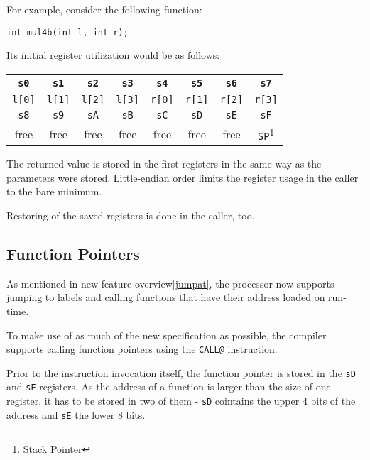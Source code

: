         For example, consider the following function:

        \begin{center}
            \texttt{int mul4b(int l, int r);}
        \end{center}

        Its initial register utilization would be as follows:

        \begin{center}\begin{tabular}{ | c | c | c | c | c | c | c | c | }
            \hline
            \texttt{s0} & \texttt{s1} & \texttt{s2} & \texttt{s3} & \texttt{s4} & \texttt{s5} & \texttt{s6} & \texttt{s7} \\
            \hline
            \texttt{l[0]} & \texttt{l[1]} & \texttt{l[2]} & \texttt{l[3]} & \texttt{r[0]} & \texttt{r[1]} & \texttt{r[2]} & \texttt{r[3]} \\
            \hline
            \hline
            \texttt{s8} & \texttt{s9} & \texttt{sA} & \texttt{sB} & \texttt{sC} & \texttt{sD} & \texttt{sE} & \texttt{sF} \\
            \hline
            free & free & free & free & free & free & free & \texttt{SP}\footnote{Stack Pointer} \\
            \hline
        \end{tabular}\end{center}

        The returned value is stored in the first registers in the same way as the parameters were stored. Little-endian order limits the register usage in the caller to the bare minimum.

        Restoring of the saved registers is done in the caller, too.

        \subsection{Function Pointers}

        As mentioned in new feature overview\ref{jumpat}, the processor now supports jumping to labels and calling functions that have their address loaded on run-time.

        To make use of as much of the new specification as possible, the compiler supports calling function pointers using the \texttt{CALL@} instruction.

        Prior to the instruction invocation itself, the function pointer is stored in the \texttt{sD} and \texttt{sE} registers. As the address of a function is larger than the size of one register, it has to be stored in two of them - \texttt{sD} cointains the upper 4 bits of the address and \texttt{sE} the lower 8 bits.

